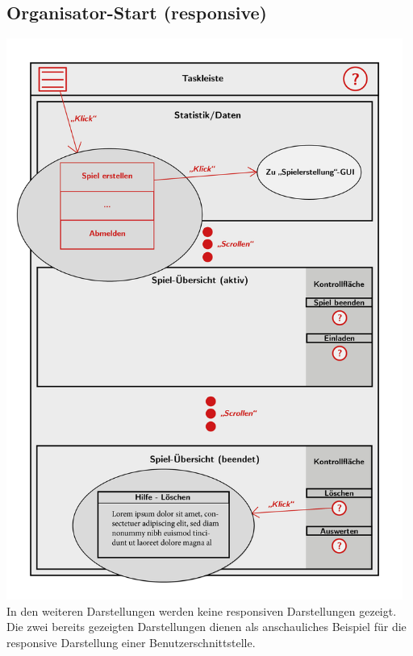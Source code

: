 \documentclass[a4paper]{scrreprt}
\begin{document}
    \subsection{Organisator-Start (responsive)}
    \centering
    \includegraphics[width=13cm]{../pictures/3_Organisator(responsive).jpg}\\
    In den weiteren Darstellungen werden keine responsiven Darstellungen gezeigt. Die zwei bereits gezeigten Darstellungen dienen als anschauliches Beispiel für
    die responsive Darstellung einer Benutzerschnittstelle.
\end{document}
